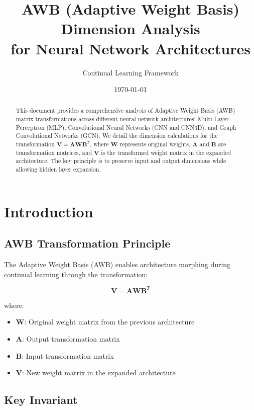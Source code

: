 \documentclass[11pt]{article}
\title{\textbf{AWB (Adaptive Weight Basis) Dimension Analysis\\for Neural Network Architectures}}
\author{Continual Learning Framework}
\date{\today}
\begin{document}
\maketitle

\begin{abstract}
This document provides a comprehensive analysis of Adaptive Weight Basis (AWB) matrix transformations across different neural network architectures: Multi-Layer Perceptron (MLP), Convolutional Neural Networks (CNN and CNN3D), and Graph Convolutional Networks (GCN). We detail the dimension calculations for the transformation $\mathbf{V} = \mathbf{A} \mathbf{W} \mathbf{B}^T$, where $\mathbf{W}$ represents original weights, $\mathbf{A}$ and $\mathbf{B}$ are transformation matrices, and $\mathbf{V}$ is the transformed weight matrix in the expanded architecture. The key principle is to preserve input and output dimensions while allowing hidden layer expansion.
\end{abstract}

\section{Introduction}

\subsection{AWB Transformation Principle}

The Adaptive Weight Basis (AWB) enables architecture morphing during continual learning through the transformation:

\begin{equation}
\mathbf{V} = \mathbf{A} \mathbf{W} \mathbf{B}^T
\end{equation}

where:
\begin{itemize}
    \item $\mathbf{W}$: Original weight matrix from the previous architecture
    \item $\mathbf{A}$: Output transformation matrix
    \item $\mathbf{B}$: Input transformation matrix
    \item $\mathbf{V}$: New weight matrix in the expanded architecture
\end{itemize}

\subsection{Key Invariant}
\end{document}
